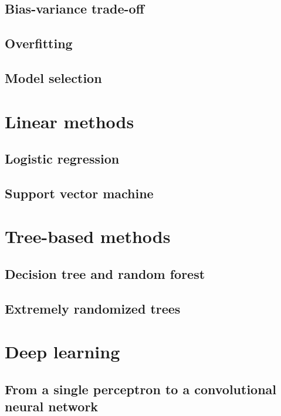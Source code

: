 \subsection{Bias-variance trade-off}

\subsection{Overfitting}

\subsection{Model selection}

\section{Linear methods}

\subsection{Logistic regression}
% 

\subsection{Support vector machine}

\section{Tree-based methods}

\subsection{Decision tree and random forest}

\subsection{Extremely randomized trees}

\section{Deep learning}

\subsection{From a single perceptron to a convolutional neural network}

